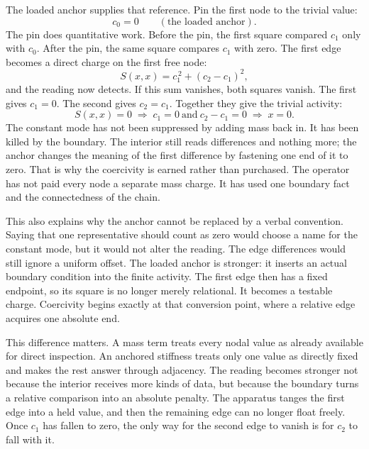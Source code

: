 The loaded anchor supplies that reference. Pin the first node to the trivial
value:
\[
  c_0 = 0
  \qquad (\text{the loaded anchor}).
\]
The pin does quantitative work. Before the pin, the first square compared
\(c_1\) only with \(c_0\). After the pin, the same square compares \(c_1\) with
zero. The first edge becomes a direct charge on the first free node:
\[
  S(x,x) = c_1^{\,2} + (c_2 - c_1)^{2},
\]
and the reading now detects. If this sum vanishes, both squares vanish. The
first gives \(c_1 = 0\). The second gives \(c_2 = c_1\). Together they give the
trivial activity:
\[
  S(x,x) = 0
  \;\Longrightarrow\;
  c_1 = 0 \ \text{and}\ c_2 - c_1 = 0
  \;\Longrightarrow\;
  x = 0.
\]
The constant mode has not been suppressed by adding mass back in. It has been
killed by the boundary. The interior still reads differences and nothing more;
the anchor changes the meaning of the first difference by fastening one end of
it to zero. That is why the coercivity is earned rather than purchased. The
operator has not paid every node a separate mass charge. It has used one
boundary fact and the connectedness of the chain.

This also explains why the anchor cannot be replaced by a verbal convention.
Saying that one representative should count as zero would choose a name for the
constant mode, but it would not alter the reading. The edge differences would
still ignore a uniform offset. The loaded anchor is stronger: it inserts an
actual boundary condition into the finite activity. The first edge then has a
fixed endpoint, so its square is no longer merely relational. It becomes a
testable charge. Coercivity begins exactly at that conversion point, where a
relative edge acquires one absolute end.

This difference matters. A mass term treats every nodal value as already
available for direct inspection. An anchored stiffness treats only one value as
directly fixed and makes the rest answer through adjacency. The reading becomes
stronger not because the interior receives more kinds of data, but because the
boundary turns a relative comparison into an absolute penalty. The apparatus
tanges the first edge into a held value, and then the remaining edge can no
longer float freely. Once \(c_1\) has fallen to zero, the only way for the second
edge to vanish is for \(c_2\) to fall with it.

